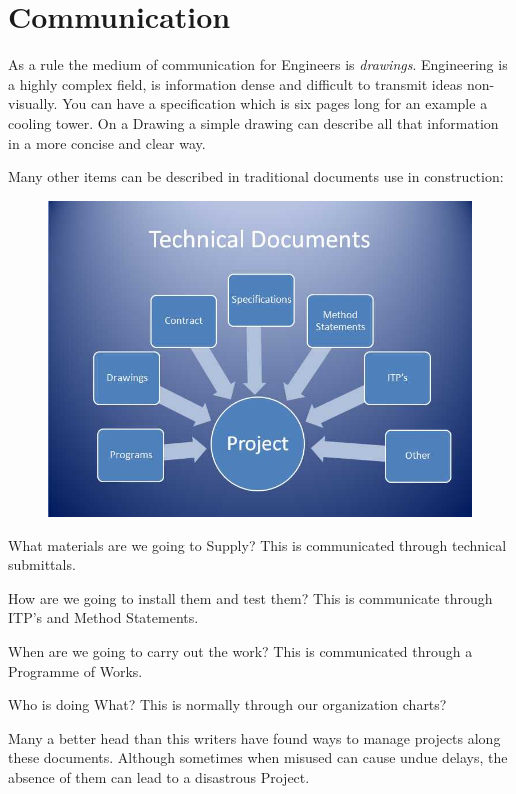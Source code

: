 \chapter{Communication}

As a rule the medium of communication for Engineers is \textit{drawings}. Engineering is a highly complex field, is information dense and difficult to transmit ideas non-visually. You can have a specification which is six pages long for an example a cooling tower. On a Drawing a simple drawing can describe all that information in a more concise and clear way.

Many other items can be described in traditional documents use in construction:

\begin{figure}
\includegraphics[width=\textwidth]{./graphics/process-02}
\end{figure}

What materials are we going to Supply? This is communicated through technical submittals.

How are we going to install them and test them? This is communicate through ITP's and Method Statements.

When are we going to carry out the work? This is communicated through a Programme of Works.

Who is doing What? This is normally through our organization charts?

Many a better head than this writers have found ways to manage projects along these documents. Although sometimes when misused can cause undue delays, the absence of them can lead to a disastrous Project.

